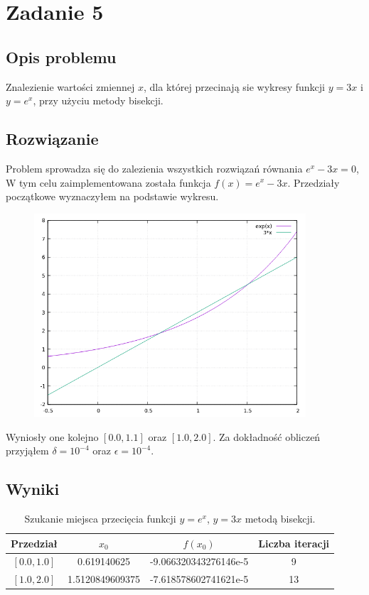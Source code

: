 \documentclass[12pt, a4paper]{article}
\begin{document}
\newpage

\section{Zadanie 5}

\subsection{Opis problemu}
Znalezienie wartości zmiennej $x$, dla której przecinają sie wykresy funkcji $y = 3x$ i $y = e^{x}$, przy użyciu metody  bisekcji.

\subsection{Rozwiązanie}
Problem sprowadza się do zalezienia wszystkich rozwiązań równania $e^x - 3x = 0$, W tym celu zaimplementowana została funkcja $f(x) = e^x - 3x$. Przedziały początkowe wyznaczyłem na podstawie wykresu.

\begin{figure}[h]
\centering
\includegraphics[width=0.9\textwidth]{zad5.png}\hfill
\end{figure} 

Wyniosły one kolejno $[0.0,1.1]$ oraz $[1.0, 2.0]$. Za dokładność obliczeń przyjąłem $\delta=10^{-4}$ oraz $\epsilon=10^{-4}$.

\newpage

\subsection{Wyniki}
\begin{table}[h]
        \centering
        \footnotesize
        \renewcommand{\arraystretch}{1.5}
\begin{tabular}{c|c|c|c} 
Przedział & $x_{0}$ & $f(x_{0})$ & Liczba iteracji \\
\hline
$[0.0, 1.0]$ & 0.619140625 & -9.066320343276146e-5 & 9 \\
$[1.0, 2.0]$ & 1.5120849609375 & -7.618578602741621e-5 & 13 \\
\end{tabular}
\caption{Szukanie miejsca przecięcia funkcji $y = e^{x}$, $y = 3x$ metodą bisekcji.}
\end{table}
\end{document}
